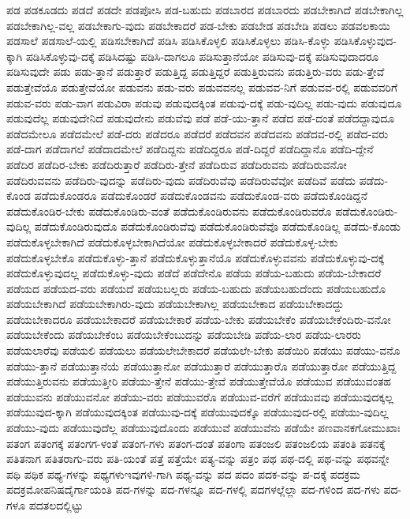 {ಪಡ
ಪಡಕೂಡದು
ಪಡದೆ
ಪಡದೇ
ಪಡಪೋಸಿ
ಪಡ-ಬಹುದು
ಪಡಬಾರದ
ಪಡಬಾರದು
ಪಡಬೇಕಾಗಿದೆ
ಪಡಬೇಕಾಗಿಲ್ಲ
ಪಡಬೇಕಾಗಿಲ್ಲ-ವಲ್ಲ
ಪಡಬೇಕಾಗು-ವುದು
ಪಡಬೇಕಾದರೆ
ಪಡ-ಬೇಕು
ಪಡಬೇಡ
ಪಡಬೇಡಿ
ಪಡಲು
ಪಡವಲಕಾಯಿ
ಪಡಸಾಲೆ
ಪಡಸಾಲೆ-ಯಲ್ಲಿ
ಪಡಿಸಬೇಕಾಗಿದೆ
ಪಡಿಸಿ
ಪಡಿಸಿಕೊಳ್ಳಲಿ
ಪಡಿಸಿಕೊಳ್ಳಲು
ಪಡಿಸಿ-ಕೊಳ್ಳು
ಪಡಿಸಿಕೊಳ್ಳುವುದ-ಕ್ಕಾಗಿ
ಪಡಿಸಿಕೊಳ್ಳುವು-ದಕ್ಕೆ
ಪಡಿಸಿದಷ್ಟು
ಪಡಿಸಿ-ದಾಗಲೂ
ಪಡಿಸುತ್ತಾನೆಯೋ
ಪಡಿಸುವು-ದಕ್ಕೆ
ಪಡಿಸುವುದಾದರೂ
ಪಡಿಸುವುದೇ
ಪಡು
ಪಡು-ತ್ತಾನೆ
ಪಡುತ್ತಾರೆ
ಪಡುತ್ತಿದ್ದ
ಪಡುತ್ತಿದ್ದರೆ
ಪಡುತ್ತಿರುವನು
ಪಡುತ್ತಿರು-ವರು
ಪಡು-ತ್ತೇವೆ
ಪಡುತ್ತೇವೆಯೊ
ಪಡುತ್ತೇವೆಯೋ
ಪಡುವನು
ಪಡು-ವರು
ಪಡುವವನಲ್ಲ
ಪಡುವವ-ನಿಗೆ
ಪಡುವವ-ರಲ್ಲಿ
ಪಡುವವರಿಗೆ
ಪಡುವ-ವರು
ಪಡು-ವಾಗ
ಪಡುವಿರಾ
ಪಡುವು
ಪಡುವುದಕ್ಕಿಂತ
ಪಡುವು-ದಕ್ಕೆ
ಪಡು-ವುದಿಲ್ಲ
ಪಡು-ವುದು
ಪಡುವುದೂ
ಪಡುವುದೆಲ್ಲ
ಪಡುವುದೇನಿದೆ
ಪಡುವುದೇನು
ಪಡುವೆವು
ಪಡೆ
ಪಡೆ-ಯು-ತ್ತಾನೆ
ಪಡೆದ
ಪಡೆ-ದಂತೆ
ಪಡೆದದ್ದಾವುದೂ
ಪಡೆದಮೇಲೂ
ಪಡೆದಮೇಲೆ
ಪಡೆ-ದರು
ಪಡೆದರೂ
ಪಡೆದರೆ
ಪಡೆದವನ
ಪಡೆದವನು
ಪಡೆದವ-ರಲ್ಲಿ
ಪಡೆದ-ವರು
ಪಡೆ-ದಾಗ
ಪಡೆದಾಗಲೆ
ಪಡೆದಾದಮೇಲೆ
ಪಡೆದಿದ್ದನು
ಪಡೆದಿದ್ದರೂ
ಪಡೆ-ದಿದ್ದರೆ
ಪಡೆದಿದ್ದಾನೊ
ಪಡೆದಿ-ದ್ದೇನೆ
ಪಡೆದಿರ
ಪಡೆದಿರ-ಬೇಕು
ಪಡೆದಿರುತ್ತಾರೆ
ಪಡೆದಿರು-ತ್ತೇನೆ
ಪಡೆದಿರುವ
ಪಡೆದಿರುವನು
ಪಡೆದಿರುವನೋ
ಪಡೆದಿರುವವನು
ಪಡೆದಿರು-ವುದನ್ನು
ಪಡೆದಿರು-ವುದು
ಪಡೆದಿರುವೆವು
ಪಡೆದಿರುವೆವೋ
ಪಡೆದಿವೆ
ಪಡೆದು
ಪಡೆದು-ಕೊಂಡ
ಪಡೆದುಕೊಂಡರೂ
ಪಡೆದುಕೊಂಡರೆ
ಪಡೆದುಕೊಂಡವನು
ಪಡೆದುಕೊಂಡ-ವರು
ಪಡೆದುಕೊಂಡಿದ್ದನೆ
ಪಡೆದುಕೊಂಡಿರ-ಬೇಕು
ಪಡೆದುಕೊಂಡಿರು-ವಂತೆ
ಪಡೆದುಕೊಂಡಿರುವನು
ಪಡೆದುಕೊಂಡಿರುವರೊ
ಪಡೆದುಕೊಂಡಿರು-ವುದಿಲ್ಲ
ಪಡೆದುಕೊಂಡಿರುವುದೊ
ಪಡೆದುಕೊಂಡಿರುವೆವು
ಪಡೆದುಕೊಂಡಿರುವೆವೊ
ಪಡೆದುಕೊಂಡಿಲ್ಲ
ಪಡೆದು-ಕೊಂಡು
ಪಡೆದುಕೊಳ್ಳಬೇಕಾಗಿದೆ
ಪಡೆದುಕೊಳ್ಳಬೇಕಾಗಿದೆಯೋ
ಪಡೆದುಕೊಳ್ಳಬೇಕಾದರೆ
ಪಡೆದುಕೊಳ್ಳ-ಬೇಕು
ಪಡೆದುಕೊಳ್ಳಬೇಕೊ
ಪಡೆದುಕೊಳ್ಳು-ತ್ತಾನೆ
ಪಡೆದುಕೊಳ್ಳುತ್ತಾನೆಯೊ
ಪಡೆದುಕೊಳ್ಳುವವನು
ಪಡೆದುಕೊಳ್ಳುವು-ದಕ್ಕೆ
ಪಡೆದುಕೊಳ್ಳುವುದಲ್ಲ
ಪಡೆದುಕೊಳ್ಳು-ವುದು
ಪಡೆದೆ
ಪಡೆದೇನೊ
ಪಡೆಯ
ಪಡೆಯ-ಬಹುದು
ಪಡೆಯ-ಬೇಕಾದರೆ
ಪಡೆಯದ
ಪಡೆಯದ-ವರು
ಪಡೆಯದೆ
ಪಡೆಯಬಲ್ಲರು
ಪಡೆಯ-ಬಹುದು
ಪಡೆಯಬಹುದೆಂದು
ಪಡೆಯಬಹುದೊ
ಪಡೆಯಬೇಕಾಗಿದೆ
ಪಡೆಯಬೇಕಾಗಿರು-ವುದು
ಪಡೆಯಬೇಕಾಗಿಲ್ಲ
ಪಡೆಯಬೇಕಾದ
ಪಡೆಯಬೇಕಾದದ್ದು
ಪಡೆಯಬೇಕಾದರೂ
ಪಡೆಯಬೇಕಾದರೆ
ಪಡೆಯಬೇಕಾರೆ
ಪಡೆಯ-ಬೇಕು
ಪಡೆಯಬೇಕೆಂ
ಪಡೆಯಬೇಕೆಂದಿರು-ವನೋ
ಪಡೆಯಬೇಕೆಂದು
ಪಡೆಯಬೇಕೆಂಬ
ಪಡೆಯಬೇಕೆಂಬುದನ್ನು
ಪಡೆಯಬೇಡಿ
ಪಡೆಯ-ಲಾರ
ಪಡೆಯ-ಲಾರರು
ಪಡೆಯಲಾರೆವು
ಪಡೆಯಲಿ
ಪಡೆಯಲು
ಪಡೆಯಲೇಬೇಕಾದರೆ
ಪಡೆಯಲೇ-ಬೇಕು
ಪಡೆಯಿರಿ
ಪಡೆಯು
ಪಡೆಯು-ವನೊ
ಪಡೆಯು-ತ್ತಾನೆ
ಪಡೆಯುತ್ತಾನೆಯೆ
ಪಡೆಯುತ್ತಾನೋ
ಪಡೆಯುತ್ತಾರೆ
ಪಡೆಯುತ್ತಾರೊ
ಪಡೆಯುತ್ತಾರೋ
ಪಡೆಯುತ್ತಿದ್ದ
ಪಡೆಯುತ್ತಿರುವನು
ಪಡೆಯುತ್ತೀರಿ
ಪಡೆಯು-ತ್ತೇನೆ
ಪಡೆಯು-ತ್ತೇವೆ
ಪಡೆಯುತ್ತೇವೆಯೊ
ಪಡೆಯುವ
ಪಡೆಯುವಂತಹ
ಪಡೆಯುವನು
ಪಡೆಯುವನೋ
ಪಡೆಯು-ವರು
ಪಡೆಯುವರೊ
ಪಡೆಯುವ-ವರೆಗೆ
ಪಡೆಯುವವು
ಪಡೆಯುವುದಕ್ಕಲ್ಲ
ಪಡೆಯುವುದ-ಕ್ಕಾಗಿ
ಪಡೆಯುವುದಕ್ಕಿಂತ
ಪಡೆಯುವು-ದಕ್ಕೆ
ಪಡೆಯುವುದಕ್ಕೊ
ಪಡೆಯುವುದ-ರಲ್ಲಿ
ಪಡೆಯು-ವುದಿಲ್ಲ
ಪಡೆಯು-ವುದು
ಪಡೆಯುವುದೆಲ್ಲ
ಪಡೆಯುವುದೊಂದು
ಪಡೆಯುವೆ
ಪಡೆಯುವೆನು
ಪಡೆಯೇ
ಪಣವಾನಕಗೋಮುಖಾಃ
ಪತಂಗ
ಪತಂಗಕ್ಕೆ
ಪತಂಗಗ-ಳಂತೆ
ಪತಂಗ-ಗಳು
ಪತಂಗ-ದಂತೆ
ಪತಂಗಾ
ಪತಂಜಲಿ
ಪತಂಜಲಿಯ
ಪತಂತಿ
ಪತನಕ್ಕೆ
ಪತಿತನಾಗ
ಪತಿತರಾಗು-ವರು
ಪತಿ-ಯಂತೆ
ಪತ್ತೆ
ಪತ್ತೆಯೇ
ಪತ್ಯ-ವನ್ನು
ಪತ್ರಂ
ಪಥ
ಪಥ-ದಲ್ಲಿ
ಪಥ-ವನ್ನು
ಪಥವನ್ನೇ
ಪಥಿ
ಪಥಿಕ
ಪಥ್ಯ-ಗಳನ್ನು
ಪಥ್ಯಗಳುಇವುಗಳಿ-ಗಾಗಿ
ಪಥ್ಯ-ವನ್ನು
ಪದ
ಪದಂ
ಪದಕ-ವನ್ನು
ಪ-ದಕ್ಕೆ
ಪದಕ್ರಮ
ಪದಕ್ರಮೋಪನಿಷದೈರ್ಗಾಯಂತಿ
ಪದ-ಗಳನ್ನು
ಪದ-ಗಳನ್ನೂ
ಪದ-ಗಳಲ್ಲಿ
ಪದಗಳಲ್ಲೆಲ್ಲಾ
ಪದ-ಗಳಿಂದ
ಪದ-ಗಳು
ಪದ-ಗಳೂ
ಪದತಲದಲ್ಲಿಟ್ಟು
}
